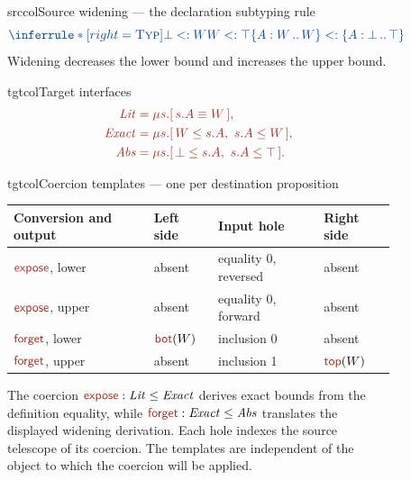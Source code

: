 \begin{figure}[!htbp]
\begin{examplepanel}{srccol}{Source widening --- the declaration subtyping rule}
\[
\src{\inferrule*[right=\textsc{Typ}]{
 \bot<:W\\ W<:\top
}{\iface{W}{W}<:\iface{\bot}{\top}}}
\]
Widening decreases the lower bound and increases the upper bound.
\end{examplepanel}
\begin{examplepanel}{tgtcol}{Target interfaces}
\[
\tgt{\begin{aligned}
 \ty{Lit}&=\obj{s.A\equiv W},\\
 \ty{Exact}&=\obj{W\le s.A,\ s.A\le W},\\
 \ty{Abs}&=\obj{\bot\le s.A,\ s.A\le\top}.
\end{aligned}}
\]
\end{examplepanel}
\begin{examplepanel}{tgtcol}{Coercion templates --- one per destination proposition}
\small
\renewcommand{\arraystretch}{1.3}
\begin{tabularx}{\linewidth}{@{}l l >{\raggedright\arraybackslash}X l@{}}
\toprule
Conversion and output & Left side & Input hole & Right side\\
\midrule
$\ev{expose}$, lower & absent & equality 0, reversed & absent\\
$\ev{expose}$, upper & absent & equality 0, forward & absent\\
$\ev{forget}$, lower & $\ev{bot}(W)$ & inclusion 0 & absent\\
$\ev{forget}$, upper & absent & inclusion 1 & $\ev{top}(W)$\\
\bottomrule
\end{tabularx}
\end{examplepanel}
\caption{The coercion \(\ev{expose}:\ty{Lit}\le\ty{Exact}\) derives
exact bounds from the definition equality, while
\(\ev{forget}:\ty{Exact}\le\ty{Abs}\) translates the displayed
widening derivation. Each hole indexes the source telescope of its
coercion. The templates are independent of the object to which the
coercion will be applied.}
\label{fig:recipes}
\end{figure}
